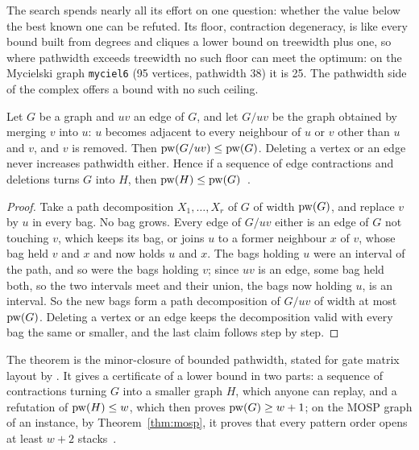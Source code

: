 The search spends nearly all its effort on one question: whether the value
below the best known one can be refuted. Its floor, contraction degeneracy, is
like every bound built from degrees and cliques a lower bound on treewidth plus
one, so where pathwidth exceeds treewidth no such floor can meet the optimum:
on the Mycielski graph \texttt{myciel6} (95 vertices, pathwidth 38) it is 25.
The pathwidth side of the complex offers a bound with no such ceiling.

\begin{theorem}\label{thm:minor}
Let $G$ be a graph and $uv$ an edge of $G$, and let $G/uv$ be the graph obtained
by merging $v$ into $u$: $u$ becomes adjacent to every neighbour of $u$ or $v$
other than $u$ and $v$, and $v$ is removed. Then $\mathrm{pw}(G/uv)\le\mathrm{pw}(G)$.
Deleting a vertex or an edge never increases pathwidth either. Hence if a
sequence of edge contractions and deletions turns $G$ into $H$, then
$\mathrm{pw}(H)\le\mathrm{pw}(G)$~.
\end{theorem}
\begin{proof}
Take a path decomposition $X_1,\dots,X_r$ of $G$ of width $\mathrm{pw}(G)$, and replace
$v$ by $u$ in every bag. No bag grows. Every edge of $G/uv$ either is an edge of
$G$ not touching $v$, which keeps its bag, or joins $u$ to a former neighbour
$x$ of $v$, whose bag held $v$ and $x$ and now holds $u$ and $x$. The bags
holding $u$ were an interval of the path, and so were the bags holding $v$;
since $uv$ is an edge, some bag held both, so the two intervals meet and their
union, the bags now holding $u$, is an interval. So the new bags form a path
decomposition of $G/uv$ of width at most $\mathrm{pw}(G)$. Deleting a vertex or an
edge keeps the decomposition valid with every bag the same or smaller, and the
last claim follows step by step.
\end{proof}

The theorem is the minor-closure of bounded pathwidth, stated for gate matrix
layout by \citet[Lemma~4.2]{FellowsLangston1987}. It gives a certificate of a
lower bound in two parts: a sequence of contractions turning $G$ into a smaller
graph $H$, which anyone can replay, and a refutation of $\mathrm{pw}(H)\le w$, which
then proves $\mathrm{pw}(G)\ge w+1$; on the MOSP graph of an instance, by
Theorem~\ref{thm:mosp}, it proves that every pattern order opens at least
$w+2$ stacks~.

